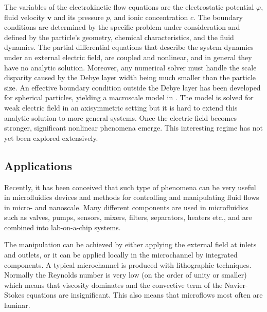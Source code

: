\documentclass[MSc,beforeExam]{iitcsthesis}
\newcommand\bv{\boldsymbol{v}}
\begin{document}
The variables of the electrokinetic flow equations are the electrostatic
potential $\varphi$, fluid velocity $\bv$ and its pressure $p$, and
ionic concentration $c$.
The boundary conditions are determined by the specific
problem under consideration and defined by the particle's
geometry, chemical characteristics, and the fluid dynamics.
The partial differential equations that describe the system dynamics
under an external electric field, are coupled and nonlinear, and
in general they have no analytic solution. 
Moreover, any numerical solver must handle the scale disparity caused by the
Debye layer width being much smaller than the particle size. 
An effective boundary condition outside the Debye layer
has been developed for spherical particles, yielding a macroscale 
model in \cite{yariv2010migration, schnitzer2012surface}.
The model is solved for weak electric field in an axisymmetric setting 
but it is hard to extend this analytic solution to more general systems.
Once the electric field becomes stronger, 
significant nonlinear phenomena emerge.
This interesting regime has not yet been explored extensively.

\subsection{Applications}

Recently, it has been conceived that such type of phenomena
can be very useful in microfluidics
devices and methods for controlling and manipulating fluid flows in micro- and nanoscale. 
Many different components are used in microfluidics such as valves, pumps, sensors, mixers, 
filters, separators, heaters etc., and are combined into lab-on-a-chip systems.

The manipulation can be achieved by either applying the external field at inlets and outlets, or it can be applied locally in the microchannel by integrated components.
A typical microchannel is produced with lithographic techniques. Normally the Reynolds
number is very low (on the order of unity or smaller) which means that viscosity dominates
and the convective term of the Navier-Stokes equations are insignificant. This also means that
microflows most often are laminar.
\end{document}
